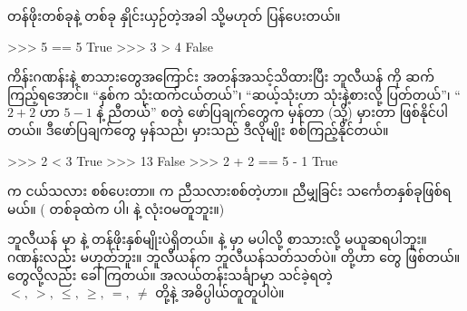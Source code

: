 တန်ဖိုးတစ်ခုနဲ့ တစ်ခု နှိုင်းယှဉ်တဲ့အခါ   သို့မဟုတ်  ပြန်ပေးတယ်။

\begin{codetxt}
>>> 5 == 5
True
>>> 3 > 4
False
\end{codetxt}


ကိန်းဂဏန်းနဲ့ စာသားတွေအကြောင်း အတန်အသင့်သိထားပြီး ဘူလီယန်  ကို ဆက်ကြည့်ရအောင်။ “နှစ်က သုံးထက်ငယ်တယ်”၊ “ဆယ့်သုံးဟာ သုံးနဲ့စားလို့ ပြတ်တယ်”၊ “\(2 + 2\) ဟာ \(5 - 1\) နဲ့ ညီတယ်” စတဲ့ ဖော်ပြချက်တွေက မှန်တာ (သို့) မှားတာ ဖြစ်နိုင်ပါတယ်။ ဒီဖော်ပြချက်တွေ မှန်သည်၊ မှားသည် ဒီလိုမျိုး စစ်ကြည့်နိုင်တယ်။ 
%
\begin{codetxt}
>>> 2 < 3
True
>>> 13 %
False
>>> 2 + 2 == 5 - 1
True
\end{codetxt}
%
\fCode{<}  က ငယ်သလား စစ်ပေးတာ။ \fCode{==}  က ညီသလားစစ်တဲ့ဟာ။ ညီမျှခြင်း သင်္ကေတနှစ်ခုဖြစ်ရမယ်။ (\fCode{=} တစ်ခုထဲက  ပါ၊ \fCode{==} နဲ့ လုံးဝမတူဘူး။) 

ဘူလီယန် မှာ  နဲ့  တန်ဖိုးနှစ်မျိုးပဲရှိတယ်။  နဲ့  မှာ  မပါလို့ စာသားလို့ မယူဆရပါဘူး။ ဂဏန်းလည်း မဟုတ်ဘူး။ ဘူလီယန်က ဘူလီယန်သတ်သတ်ပဲ။ \fCode{<}\fEn{,} \fCode{>}\fEn{,} \fCode{<=}\fEn{,} \fCode{>=}\fEn{,} \fCode{==}\fEn{,} \fCode{!=} တို့ဟာ  တွေ ဖြစ်တယ်။  တွေလို့လည်း ခေါ်ကြတယ်။ အလယ်တန်းသင်္ချာမှာ သင်ခဲ့ရတဲ့ \(<,\ >,\ \leq,\ \geq,\ =,\ \neq \) တို့နဲ့ အဓိပ္ပါယ်တူတူပါပဲ။




\afterpage{\blankpage}